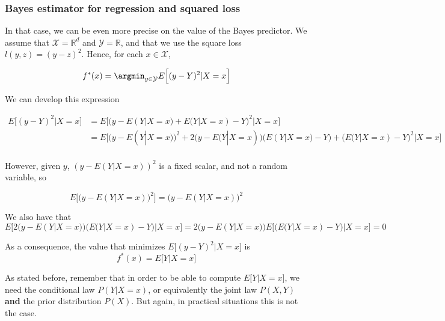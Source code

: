 \documentclass[
10pt, %
a4paper, %
oneside, %
headinclude,footinclude, %
BCOR5mm, %
]{scrartcl}
\begin{document}
    \subsubsection{\large\color{Periwinkle}Bayes estimator for regression and squared loss}

    In that case, we can be even more precise on the value of the Bayes predictor. We assume that $ \mathcal{X} = \mathbb{R}^d$ and $ \mathcal{Y}= \mathbb{R} $, and that we use the square loss $l(y,z)=(y-z)^2$. Hence, for each $x\in \mathcal{X} $,

\begin{equation*}
    f^*(x)= \argmin_{y\in \mathcal{Y} }E\Big[(y-Y)^2 |X=x\Big]
\end{equation*}

We can develop this expression 

\begin{equation*}
    \begin{aligned}
	E\Big[(y-Y)^2 |X=x\Big]&= E\Big[\big(y-E(Y|X=x)+E(Y|X=x)-Y\big)^2 |X=x\Big]\\
	&=E\Big[\big(y-E(Y|X=x)\big)^2+2\big(y-E(Y|X=x)\big)\big(E(Y|X=x)-Y\big)+\big(E(Y|X=x)-Y\big)^2 |X=x\Big]\\
    \end{aligned}
\end{equation*}

However, given $y$, $(y-E(Y|X=x))^2$  is a fixed scalar, and not a random variable, so 

\begin{equation*}
    E\Big[\big(y-E(Y|X=x)\big)^2\Big]=\big(y-E(Y|X=x)\big)^2
\end{equation*}

We also have that
\begin{equation*}
    E\Big[2\big(y-E(Y|X=x)\big)\big(E(Y|X=x)-Y\big)|X=x\Big]=2\big(y-E(Y|X=x)\big)E\Big[\big(E(Y|X=x)-Y\big)|X=x\Big]=0
\end{equation*}

As a consequence, the value that minimizes $E\big[(y-Y)^2 |X=x\big]$ is
\begin{equation}
    f^*(x)=E\big[Y|X=x\big]
\end{equation}

\begin{remark}
    As stated before, remember that in order to be able to compute $E\big[Y|X=x\big]$, we need the conditional law
    $P(Y|X=x)$, or equivalently  the joint law $P(X,Y)$ \textbf{{and}} the prior
    distribution $P(X)$. But again, in practical situations this is not the
    case.
\end{remark}
\end{document}
